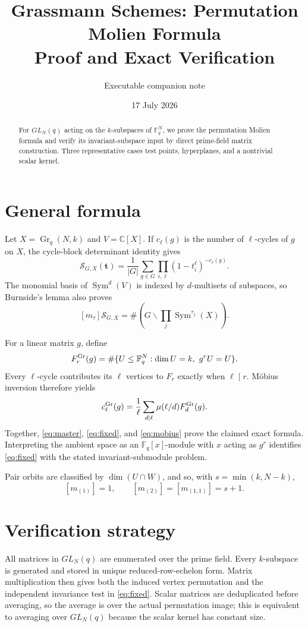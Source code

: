 \documentclass[11pt]{article}
\title{Grassmann Schemes: Permutation Molien Formula\\Proof and Exact Verification}
\author{Executable companion note}
\date{17 July 2026}
\newcommand{\Sym}{\operatorname{Sym}}
\newcommand{\Gr}{\operatorname{Gr}}
\newcommand{\cS}{\mathcal S}
\begin{document}
\maketitle
\begin{abstract}
For $GL_N(q)$ acting on the $k$-subspaces of $\mathbb F_q^N$, we prove the
permutation Molien formula and verify its invariant-subspace input by direct
prime-field matrix construction.  Three representative cases test points,
hyperplanes, and a nontrivial scalar kernel.
\end{abstract}

\section{General formula}
Let $X=\Gr_q(N,k)$ and $V=\mathbb C[X]$.  If $c_\ell(g)$ is the number of
$\ell$-cycles of $g$ on $X$, the cycle-block determinant identity gives
\begin{equation}\label{eq:master}
\cS_{G,X}(\mathbf t)=\frac1{|G|}\sum_{g\in G}
\prod_{i,\ell}(1-t_i^\ell)^{-c_\ell(g)}.
\end{equation}
The monomial basis of $\Sym^d(V)$ is indexed by $d$-multisets of subspaces,
so Burnside's lemma also proves
\begin{equation}\label{eq:orbit}
[m_\tau]\cS_{G,X}=\#\left(G\backslash\prod_j\Sym^{\tau_j}(X)\right).
\end{equation}

For a linear matrix $g$, define
\begin{equation}\label{eq:fixed}
F_r^{\rm Gr}(g)=\#\{U\leq\mathbb F_q^N:\dim U=k,\ g^rU=U\}.
\end{equation}
Every $\ell$-cycle contributes its $\ell$ vertices to $F_r$ exactly when
$\ell\mid r$.  Möbius inversion therefore yields
\begin{equation}\label{eq:mobius}
c_\ell^{\rm Gr}(g)=\frac1\ell\sum_{d\mid\ell}
\mu(\ell/d)F_d^{\rm Gr}(g).
\end{equation}
Together, \eqref{eq:master}, \eqref{eq:fixed}, and \eqref{eq:mobius} prove the
claimed exact formula.  Interpreting the ambient space as an
$\mathbb F_q[x]$-module with $x$ acting as $g^r$ identifies
\eqref{eq:fixed} with the stated invariant-submodule problem.

Pair orbits are classified by $\dim(U\cap W)$, and so, with
$s=\min(k,N-k)$,
\[
[m_{(1)}]=1,\qquad [m_{(2)}]=[m_{(1,1)}]=s+1.
\]

\section{Verification strategy}
All matrices in $GL_N(q)$ are enumerated over the prime field.  Every
$k$-subspace is generated and stored in unique reduced-row-echelon form.
Matrix multiplication then gives both the induced vertex permutation and the
independent invariance test in \eqref{eq:fixed}.  Scalar matrices are deduplicated
before averaging, so the average is over the actual permutation image; this is
equivalent to averaging over $GL_N(q)$ because the scalar kernel has constant
size.
\end{document}
